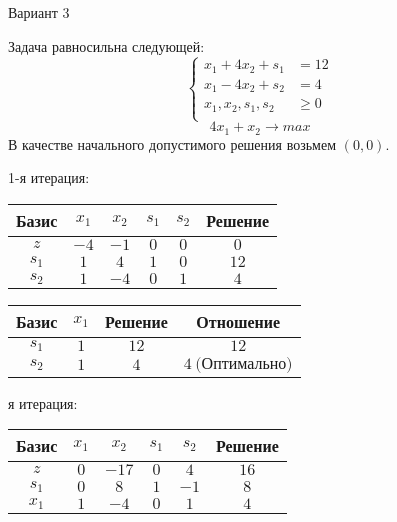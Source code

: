 \documentclass{article}%
\begin{document}
\newpage%
\begin{center}%
\begin{Huge}%
Вариант 3%
\end{Huge}%
\end{center}%
Задача равносильна следующей: %
\[%
\left\{\begin{aligned}x_{1}+4x_{2}+s_{1} & =12 \\x_{1}-4x_{2}+s_{2} & =4 \\x_{1},x_{2},s_{1},s_{2} & \ge 0 \\ \end{aligned}\right.%
\]%
\[%
4x_{1}+x_{2}  \to max%
\]%
В качестве начального допустимого решения возьмем %
$(0, 0).$%
\begin{flushleft}%
1{-}я итерация: %
\newline%
\newline%
\renewcommand{\arraystretch}{1.3}%
\begin{tabular}{|c|cccc|c|}%
\hline%
Базис&$x_{1}$&$x_{2}$&$s_{1}$&$s_{2}$&Решение\\%
\hline%
$z$&$-4$&$-1$&$0$&$0$&$0$\\%
\hline%
$s_{1}$&$1$&$4$&$1$&$0$&$12$\\%
$s_{2}$&$1$&$-4$&$0$&$1$&$4$\\%
\hline%
\end{tabular}%
\newline%
\newline%
\newline%
\begin{tabular}{|cccc|}%
\hline%
Базис&$x_{1}$&Решение&Отношение\\%
\hline%
$s_{1}$&$1$&$12$&$12$\\%
$s_{2}$&$1$&$4$&$4\: \text{(Оптимально)}$\\%
\hline%
\end{tabular}%
\newline%
\newline%
я итерация: %
\newline%
\newline%
\renewcommand{\arraystretch}{1.3}%
\begin{tabular}{|c|cccc|c|}%
\hline%
Базис&$x_{1}$&$x_{2}$&$s_{1}$&$s_{2}$&Решение\\%
\hline%
$z$&$0$&$-17$&$0$&$4$&$16$\\%
\hline%
$s_{1}$&$0$&$8$&$1$&$-1$&$8$\\%
$x_{1}$&$1$&$-4$&$0$&$1$&$4$\\%
\hline%
\end{tabular}%

\end{flushleft}
\end{document}
